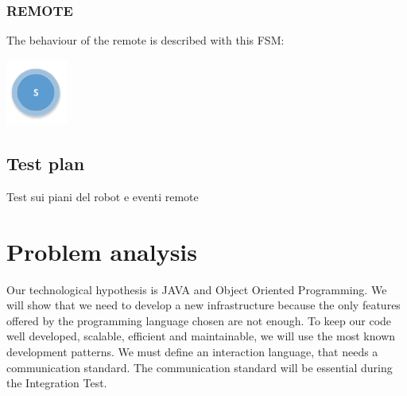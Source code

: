 \documentclass{llncs}
\newcommand{\labelsec}[1]{\label{sec:#1}}
\begin{document}
\subsubsection{REMOTE}
The behaviour of the remote is described with this FSM:\\
\begin{center}
   	\includegraphics[width=2cm]{img/fsmRemoteRequirementAnalysis.png}\\
\end{center}
\subsection{Test plan}
Test sui piani del robot e eventi remote
\labelsec{Test plan}
\section{Problem analysis}
\labelsec{ProblemAnalysis}
Our technological hypothesis is JAVA and Object Oriented Programming. We will show that we need to develop a new infrastructure because the only features offered by the programming language chosen are not enough.  
To keep our code well developed, scalable, efficient and maintainable, we will use the most known development patterns.
We must define an interaction language, that needs a communication standard. The communication standard will be essential during the Integration Test.
\end{document}
